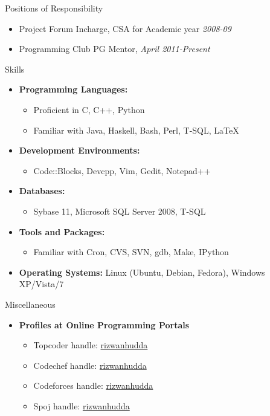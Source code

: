 \documentclass[11pt,oneside]{article}
\newenvironment{ressection}[1]{
	\vspace{4pt}
	{\fontfamily{phv}\selectfont\Large#1}
	\begin{itemize}
	\vspace{3pt}
}{
	\end{itemize}
}
\newcommand{\resitem}[1]{
	\vspace{-4pt}
	\item \begin{flushleft} #1 \end{flushleft}
}
\newcommand{\ressubitem}[1]{
	\vspace{-1pt}
	\item \begin{flushleft} #1 \end{flushleft}
}
\newenvironment{reslist}[1]{
	\resitem{\textbf{#1}}
	\vspace{-5pt}
	\begin{itemize}
}{
	\end{itemize}
}
\begin{document}
\begin{ressection}{Positions of Responsibility}
 \resitem{Project Forum Incharge, CSA for Academic year \textit{2008-09}}
 \resitem{Programming Club PG Mentor, \textit{April 2011-Present} }
\end{ressection}

\begin{ressection}{Skills}

	\begin{reslist}{Programming Languages:}

		\ressubitem{Proficient in C, C++, Python}

		\ressubitem{Familiar with Java, Haskell, Bash, Perl, T-SQL, \LaTeX }

	\end{reslist}

	\begin{reslist}{Development Environments:}

	      \ressubitem{Code::Blocks, Devcpp, Vim, Gedit, Notepad++}

	\end{reslist}

	\begin{reslist}{Databases:}
	    
	      \ressubitem{Sybase 11, Microsoft SQL Server 2008, T-SQL}

	\end{reslist}

	\begin{reslist}{Tools and Packages:}

		\ressubitem{Familiar with Cron, CVS, SVN, gdb, Make, IPython}

	\end{reslist}

	\resitem{\textbf{Operating Systems:} Linux (Ubuntu, Debian, Fedora), Windows XP/Vista/7}

\end{ressection}

\begin{ressection}{Miscellaneous}

 \begin{reslist}{Profiles at Online Programming Portals}
    \ressubitem{ Topcoder handle: \href{http://community.topcoder.com/tc?module=MemberProfile&cr=22694712}{rizwanhudda} }
    \ressubitem{ Codechef handle: \href{http://codechef.com/users/rizwanhudda}{rizwanhudda} }
    \ressubitem{ Codeforces handle: \href{http://codeforces.com/profile/rizwanhudda}{rizwanhudda} }
    \ressubitem{ Spoj handle: \href{http://spoj.pl/users/rizwanhudda}{rizwanhudda} }
 \end{reslist}

\end{ressection}
\end{document}
